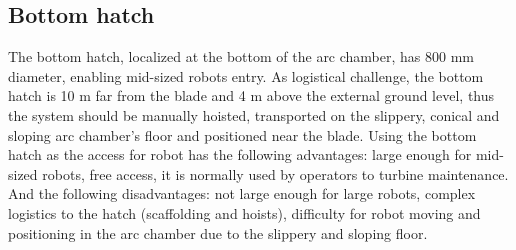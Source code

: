 \subsection{Bottom hatch}
The bottom hatch, localized at the bottom of the arc chamber, has 800 mm
diameter, enabling mid-sized robots entry. As logistical challenge, the bottom
hatch is 10 m far from the blade and 4 m above the external ground level,
thus the system should be manually hoisted, transported on the slippery, conical
and sloping arc chamber's floor and positioned near the blade. Using the bottom
hatch as the access for robot has the following advantages: large enough for
mid-sized robots, free access, it is normally used by operators to turbine
maintenance. And the following disadvantages: not large enough for large robots,
complex logistics to the hatch (scaffolding and hoists), difficulty for robot
moving and positioning in the arc chamber due to the slippery and sloping floor.





